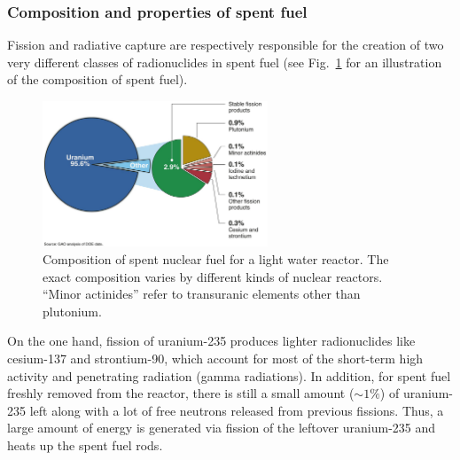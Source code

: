 \documentclass[nofootinbib,preprint,aps]{revtex4-1}
\begin{document}
        \subsubsection{Composition and properties of spent fuel}
        Fission and radiative capture are respectively responsible for the creation of two very
        different classes of radionuclides in spent fuel
        (see Fig.~\ref{fig:spentfuel} for an illustration of the composition of spent fuel).
        \begin{figure}[h]
            \centering
            \includegraphics[width=0.6\textwidth]{spent-fuel.png}
            \caption{Composition of spent nuclear fuel for a light water reactor. The exact composition varies
            by different kinds of nuclear reactors. ``Minor actinides'' refer to transuranic elements other than plutonium.\cite{gao}}
            \label{fig:spentfuel}
        \end{figure}

        On the one hand, fission of uranium-235 produces lighter radionuclides like cesium-137 and strontium-90, which
        account for most of the short-term high activity and penetrating radiation (gamma radiations).
        In addition, for spent fuel freshly removed from the reactor, there is still a small amount ($\sim 1\%$)
        of uranium-235 left along with a lot of free neutrons released from previous fissions. Thus, a large amount
        of energy is generated via fission of the leftover uranium-235 and heats up the spent fuel rods.
\end{document}

